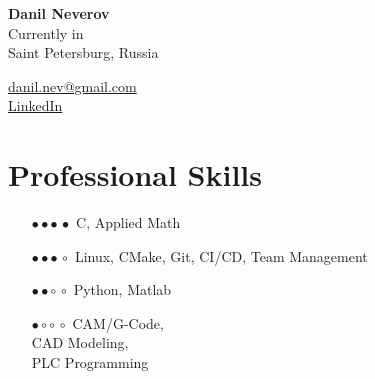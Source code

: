 \documentclass[a4paper,10pt]{article}
\def\CC{{C\nolinebreak[4]\hspace{-.05em}\raisebox{.4ex}{\tiny\bf ++}}}
\begin{document}
\thispagestyle{empty}

\begin{adjustbox}{valign=t}
\begin{minipage}{0.3\textwidth} %

\begin{center}
\vspace{10 pt}

{\LARGE \bfseries Danil Neverov}\\
\vspace{10 pt}
Currently in\\
Saint Petersburg, Russia

\textcolor{ColorTwo}{\faEnvelopeO} 
\href{mailto:danil.nev@gmail.com}{danil.nev@gmail.com} \\
\textcolor{ColorTwo}{\faChain} 
\href{https://www.linkedin.com/in/danil-neverov-37567066/}{LinkedIn}
\end{center}
\vfill

\section*{Professional Skills}
\raggedright
\begin{enumerate}[align = left, labelwidth = 4em, leftmargin = \dimexpr\labelwidth + \labelsep\relax]
	\item [\textcolor{ColorOne}{$\bullet \bullet \bullet \, \bullet $}] \CC, Applied Math
	\item [\textcolor{ColorOne}{$\bullet \bullet \bullet \, \circ $}] Linux, CMake, Git, CI/CD, Team Management
	\item [\textcolor{ColorOne}{$\bullet \bullet \circ \, \circ $}] Python, Matlab
	\item [\textcolor{ColorOne}{$\bullet \circ \circ \, \circ $}] CAM/G-Code, \\CAD Modeling, \\PLC Programming
\end{enumerate}
\vfill


\end{minipage}
\end{adjustbox}
\end{document}
